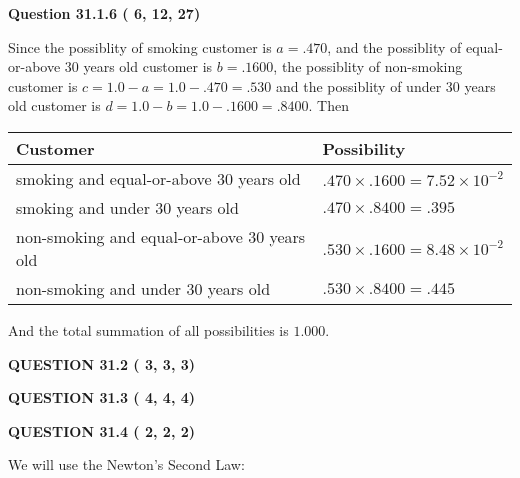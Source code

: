 \documentclass[12pt]{article}
\begin{document}
 
 
  
\vspace{0.2in}
  
{\textbf{\Large{Question
31.1.6 
 (          6,         12,         27)
}}}
  
  
 
 

Since the possiblity of  %
smoking customer is $ a =  %
.470 $,
and the possiblity of  %
equal-or-above 30 years old customer is $ b =  %
.1600 $,
the possiblity of  %
non-smoking customer is $ c = 1.0 - a = 1.0 -
.470
=  %
.530 $ and the possiblity of  %
under 30 years old
customer is $ d = 1.0 - b = 1.0 -  %
.1600 =  %
.8400  $.
Then
 
\noindent
\begin{tabular}{|l|l|}
\hline
Customer & Possibility \\
\hline
smoking  and  %
equal-or-above 30 years old  &
  $ %
.470 \times  %
.1600 =  %
7.52 \times 10^{-2}$ \\
\hline
smoking  and  %
under 30 years old &
  $ %
.470 \times  %
.8400 =  %
.395$ \\
\hline
 non-smoking and  %
equal-or-above 30 years old  &
  $ %
.530 \times  %
.1600 =  %
8.48 \times 10^{-2}$ \\
\hline
 non-smoking and  %
under 30 years old &
  $ %
.530 \times  %
.8400 =  %
.445$ \\
\hline
\end{tabular}
 
\noindent
And the total summation of all possibilities is $  %
1.000 $.
 
 
 
 
  
\vspace{0.2in}
  
{\textbf{\Large{QUESTION
31.2 
 (          3,          3,          3)
}}}
  
  
  
\vspace{0.2in}
  
{\textbf{\Large{QUESTION
31.3 
 (          4,          4,          4)
}}}
  
  
  
\vspace{0.2in}
  
{\textbf{\Large{QUESTION
31.4 
 (          2,          2,          2)
}}}
  
  
 
 

We will use the Newton's Second Law:
 
\end{document}
